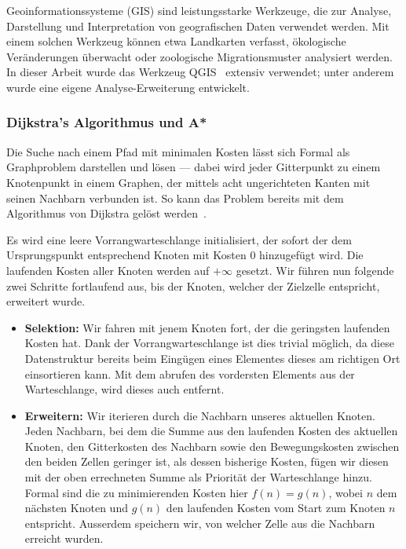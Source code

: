 \begin{multicols}{2}
Geoinformationssysteme (GIS) sind leistungsstarke Werkzeuge, die zur Analyse, Darstellung und Interpretation von geografischen Daten verwendet werden. Mit einem solchen Werkzeug können etwa Landkarten verfasst, ökologische Veränderungen überwacht oder zoologische Migrationsmuster analysiert werden.
In dieser Arbeit wurde das Werkzeug QGIS~\cite{qgis} extensiv verwendet; unter anderem wurde eine eigene Analyse-Erweiterung entwickelt.


\subsubsection{Dijkstra's Algorithmus und A*}

Die Suche nach einem Pfad mit minimalen Kosten lässt sich Formal als Graphproblem darstellen und lösen --- dabei wird jeder Gitterpunkt zu einem Knotenpunkt in einem Graphen, der mittels acht ungerichteten Kanten mit seinen Nachbarn verbunden ist. So kann das Problem bereits mit dem Algorithmus von Dijkstra gelöst werden~\cite{dijkstra1959note}.

Es wird eine leere Vorrangwarteschlange initialisiert, der sofort der dem Ursprungspunkt entsprechend Knoten mit Kosten 0 hinzugefügt wird. Die laufenden Kosten aller Knoten werden auf $+ \infty$ gesetzt. Wir führen nun folgende zwei Schritte fortlaufend aus, bis der Knoten, welcher der Zielzelle entspricht, erweitert wurde.
\begin{itemize}
  \item \textbf{Selektion:} Wir fahren mit jenem Knoten fort, der die geringsten laufenden Kosten hat. Dank der Vorrangwarteschlange ist dies trivial möglich, da diese Datenstruktur bereits beim Eingügen eines Elementes dieses am richtigen Ort einsortieren kann. Mit dem abrufen des vordersten Elements aus der Warteschlange, wird dieses auch entfernt.
  \item \textbf{Erweitern:} Wir iterieren durch die Nachbarn unseres aktuellen Knoten. Jeden Nachbarn, bei dem die Summe aus den laufenden Kosten des aktuellen Knoten, den Gitterkosten des Nachbarn sowie den Bewegungskosten zwischen den beiden Zellen geringer ist, als dessen bisherige Kosten, fügen wir diesen mit der oben errechneten Summe als Priorität der Warteschlange hinzu. Formal sind die zu minimierenden Kosten hier $f(n)=g(n)$, wobei $n$ dem nächsten Knoten und $g(n)$ den laufenden Kosten vom Start zum Knoten $n$ entspricht. Ausserdem speichern wir, von welcher Zelle aus die Nachbarn erreicht wurden.
\end{itemize}


\end{multicols}

